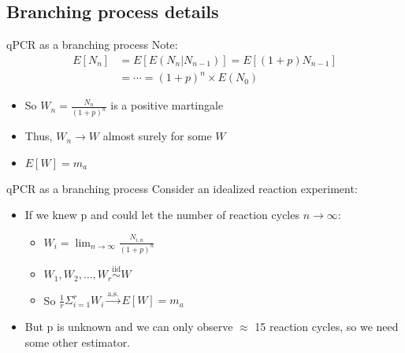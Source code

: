 \documentclass{beamer}
\begin{document}
\subsection{Branching process details}


\begin{frame}{qPCR as a branching process}
Note:\\

\begin{align*}
  E[N_{n}] &= E[E(N_{n}|N_{n-1})] = E[(1+p)N_{n-1}] \\
  &= \cdots = (1+p)^n \times E(N_0)
\end{align*}
\vspace{3mm}
\begin{itemize}
  \item So $W_n = \frac{N_n}{(1+p)^n}$ is a positive martingale
  \vspace{3mm}
  \item Thus, $W_n \to W$ almost surely for some $W$
  \vspace{3mm}
  \item $E[W] = m_a$
\end{itemize}
\end{frame}


\begin{frame}{qPCR as a branching process}
Consider an idealized reaction experiment:
  \begin{itemize}
    \item If we knew p and could let the number of reaction cycles $n \to \infty$:
    \begin{itemize}
    	\vspace{3mm}
    	\item $W_i = \lim_{n \to \infty} \frac{N_{i,n}}{(1+p)^n} $
	\vspace{2mm}
	\item $W_1, W_2, \ldots, W_r \stackrel{\text{iid}}{\sim} W$
	\vspace{4mm}
	\item So $\frac{1}{r} \Sigma_{i=1}^r W_i \stackrel{\text{a.s.}}{\to} E[W] = m_a$
    \end{itemize}
    \item But p is unknown and we can only observe $\approx$ 15 reaction cycles, so we need some other estimator.
  \end{itemize}
\end{frame}
\end{document}
